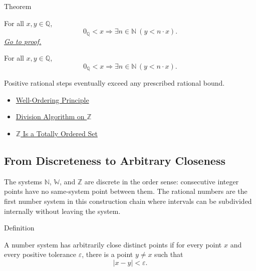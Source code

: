 \begin{theorembox}{Theorem}
\begin{theorem}
\label{thm:archimedean-property-of-q}
For all $x,y\in\mathbb{Q}$,
\[
0_{\mathbb{Q}}<x
\Longrightarrow
\exists n\in\mathbb{N}\ (y<n\cdot x).
\]
\hyperref[prf:archimedean-property-of-q]{\textit{Go to proof.}}
\end{theorem}
\end{theorembox}

\begin{remark*}
For all $x,y\in\mathbb{Q}$,
\[
0_{\mathbb{Q}}<x
\Longrightarrow
\exists n\in\mathbb{N}\,(y<n\cdot x).
\]
\end{remark*}

\begin{remark*}[Interpretation]
Positive rational steps eventually exceed any prescribed rational bound.
\end{remark*}

\begin{dependencies}
\begin{itemize}
  \item \hyperref[thm:well-ordering-principle]{Well-Ordering Principle}
  \item \hyperref[thm:division-algorithm-on-z]{Division Algorithm on $\mathbb{Z}$}
  \item \hyperref[thm:z-totally-ordered-set]{$\mathbb{Z}$ Is a Totally Ordered Set}
\end{itemize}
\end{dependencies}

\subsection*{From Discreteness to Arbitrary Closeness}

\begin{remark*}
The systems $\mathbb{N}$, $\mathbb{W}$, and $\mathbb{Z}$ are discrete in the
order sense: consecutive integer points have no same-system point between
them. The rational numbers are the first number system in this construction
chain where intervals can be subdivided internally without leaving the system.
\end{remark*}

\begin{definitionbox}{Definition}
\begin{definition}
\label{def:arbitrarily-close-distinct-points}
A number system has arbitrarily close distinct points if for every point $x$
and every positive tolerance $\varepsilon$, there is a point $y\ne x$ such that
\[
|x-y|<\varepsilon.
\]
\end{definition}
\end{definitionbox}

